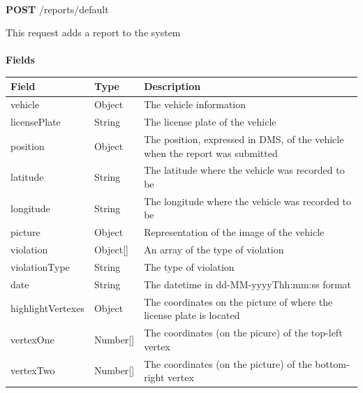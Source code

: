 						\paragraph{}
						\textbf{POST} /reports/default
						
						This request adds a report to the system
						\paragraph{}
							\textbf{Fields}
							\begin{table}[!h]
								\begin{tabular}{L{0.23\textwidth}L{0.15\textwidth}L{0.42\textwidth}}
									\toprule
									Field & Type & Description \\
									\midrule
								 	vehicle & Object & The vehicle information \\
								 	\hspace{2.5mm}licensePlate & String & The license plate of the vehicle \\
								 	position & Object & The position, expressed in DMS, of the vehicle when the report was submitted  \\
								 	\hspace{2.5mm}latitude & String & The latitude where the vehicle was recorded to be \\
								 	\hspace{3mm}longitude & String & The longitude where the vehicle was recorded to be \\
								 	picture & Object & Representation of the image of the vehicle \\
								 	violation & Object[] & An array of the type of violation \\
								 	\hspace{2.5mm}violationType & String & The type of violation \\
								 	date & String & The datetime in \newline dd-MM-yyyyThh:mm:ss format \\
								 	highlightVertexes & Object & The coordinates on the picture of where the license plate is located \\
								 	\hspace{2.5mm}vertexOne & Number[] & The coordinates (on the picure) of the top-left vertex \\
								 	\hspace{2.5mm}vertexTwo & Number[] & The coordinates (on the picture) of the bottom-right vertex \\
								 	\bottomrule
								\end{tabular}
							\end{table}
						\clearpage
